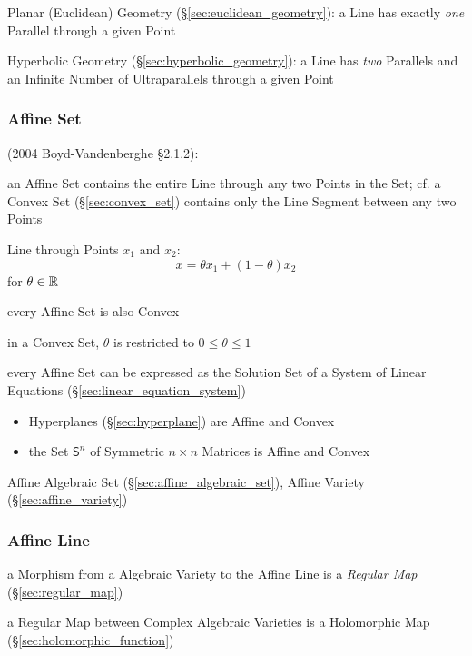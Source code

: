 \fist Planar (Euclidean) Geometry (\S\ref{sec:euclidean_geometry}): a Line has
  exactly \emph{one} Parallel through a given Point

\fist Hyperbolic Geometry (\S\ref{sec:hyperbolic_geometry}): a Line has
\emph{two} Parallels and an Infinite Number of Ultraparallels through a
given Point



\subsubsection{Affine Set}\label{sec:affine_set}

(2004 Boyd-Vandenberghe \S2.1.2):

an Affine Set contains the entire Line through any two Points in the Set; cf. a
Convex Set (\S\ref{sec:convex_set}) contains only the Line Segment between any
two Points

Line through Points $x_1$ and $x_2$:
\[
  x = \theta x_1 + (1-\theta) x_2
\]
for $\theta \in \mathbb{R}$

every Affine Set is also Convex

\fist in a Convex Set, $\theta$ is restricted to $0 \leq \theta \leq 1$

every Affine Set can be expressed as the Solution Set of a System of Linear
Equations (\S\ref{sec:linear_equation_system})

\begin{itemize}
  \item Hyperplanes (\S\ref{sec:hyperplane}) are Affine and Convex
  \item the Set $\mathsf{S}^n$ of Symmetric $n \times n$ Matrices is Affine and
    Convex
\end{itemize}

\fist Affine Algebraic Set (\S\ref{sec:affine_algebraic_set}), Affine Variety
(\S\ref{sec:affine_variety})



\subsubsection{Affine Line}\label{sec:affine_line}

a Morphism from a Algebraic Variety to the Affine Line is a \emph{Regular Map}
(\S\ref{sec:regular_map})

a Regular Map between Complex Algebraic Varieties is a Holomorphic Map
(\S\ref{sec:holomorphic_function})



